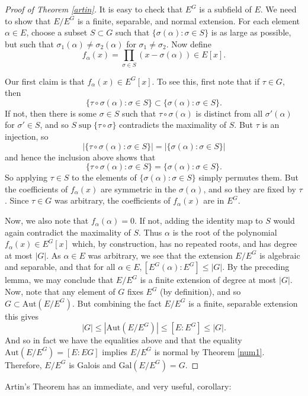 \documentclass[12pt]{report}
\theoremstyle{definition}
\def\Aut{\text{Aut}}
\def\aa{\alpha}
\def\Gal{\text{Gal}}
\begin{document}
\begin{proof}[Proof of Theorem \ref{artin}]
    It is easy to check that $E^G$ is a subfield of $E$. We need to show that $E/E^G$ is a finite, separable, and normal extension. For each element $\aa \in E$, choose a subset $S \subset G$ such that $\{\sigma(\aa): \sigma\in S\}$ is as large as possible, but such that $\sigma_1(\aa) \not= \sigma_2(\aa)$ for $\sigma_1\not=\sigma_2$.
    Now define $$f_\aa(x) =\prod_{\sigma\in S}(x-\sigma(\aa)) \in E[x].$$
    
    Our first claim is that $f_\aa(x) \in E^G[x]$.
    To see this, first note that if $\tau \in G$, then
    $$\{\tau\circ\sigma(\aa):\sigma\in S\}\subset \{\sigma(\aa): \sigma\in S\}.$$
    If not, then there is some $\sigma \in S$ such that $\tau \circ \sigma(\aa)$ is distinct from all $\sigma'(\aa)$ for $\sigma' \in S$, and so $S\sup \{ \tau\circ \sigma \}$ contradicts the maximality of $S$. But $\tau$ is an injection, so $$|\{\tau\circ\sigma(\aa):\sigma\in S\}|=|\{\sigma(\aa): \sigma\in S\}|$$ and hence the inclusion above shows that $$\{\tau\circ\sigma(\aa):\sigma\in S\} = \{\sigma(\aa): \sigma\in S\}.$$
    So applying $\tau \in S$ to the elements of $\{\sigma(\aa): \sigma\in S\}$ simply permutes them. But the coefficients of $f_\aa(x)$ are symmetric in the $\sigma(\aa)$, and so they are fixed by $\tau$. Since $\tau \in G$ was arbitrary, the coefficients of $f_\aa(x)$ are in $E^G$.

    Now, we also note that $f_\aa(\aa) = 0$. If not, adding the identity map to $S$ would again contradict the maximality of $S$. Thus $\aa$ is the root of the polynomial $f_\aa(x) \in E^G[x]$ which, by construction, has no repeated roots, and has degree at most $|G|$. As $\aa \in E$ was arbitrary, we see that the extension $E/E^G$ is algebraic and separable, and that for all $\aa \in E, [E^G(\aa) : E^G] \leq |G|$. By the preceding lemma, we may conclude that $E/E^G$ is a finite extension of degree at most $|G|$. Now, note that any element of $G$ fixes $E^G$ (by definition), and so $G \subset \Aut(E/E^G)$. But combining the fact $E/E^G$ is a finite, separable extension this gives $$|G| \leq |\Aut(E/E^G)| \leq [E:E^G] \leq |G|.$$ 
    And so in fact we have the equalities above and that the equality $\Aut(E/E^G) = [E : EG]$ implies $E/E^G$ is normal by Theorem \ref{num1}. Therefore, $E/E^G$ is Galois and $\Gal(E/E^G) = G$.
\end{proof}

Artin's Theorem has an immediate, and very useful, corollary:
\end{document}
